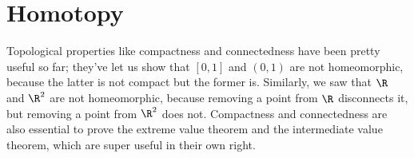 \documentclass[noname]{notes}
\begin{document}
%
%
%


\chapter{Homotopy}

Topological properties like compactness and connectedness have been pretty useful so far; they've let us show that $[0,1]$ and $(0,1)$ are not homeomorphic, because the latter is not compact but the former is. Similarly, we saw that $\R$ and $\R^2$ are not homeomorphic, because removing a point from $\R$ disconnects it, but removing a point from $\R^2$ does not. Compactness and connectedness are also essential to prove the extreme value theorem and the intermediate value theorem, which are super useful in their own right. 
\end{document}
